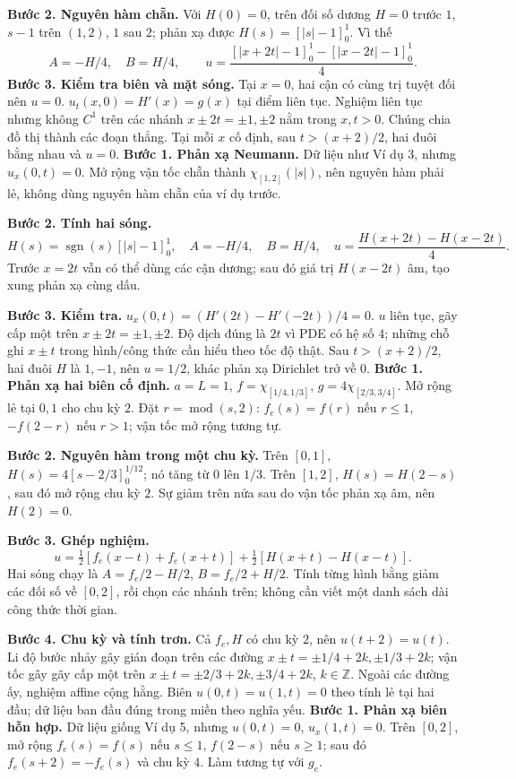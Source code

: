 \textbf{Bước 2. Nguyên hàm chẵn.} Với $H(0)=0$, trên đối số dương $H=0$ trước $1$, $s-1$ trên $(1,2)$, $1$ sau $2$; phản xạ được $H(s)=[|s|-1]_0^1$. Vì thế
\[A=-H/4,\quad B=H/4,\qquad u=\frac{[|x+2t|-1]_0^1-[|x-2t|-1]_0^1}{4}.\]
\textbf{Bước 3. Kiểm tra biên và mặt sóng.} Tại $x=0$, hai cận có cùng trị tuyệt đối nên $u=0$. $u_t(x,0)=H'(x)=g(x)$ tại điểm liên tục. Nghiệm liên tục nhưng không $C^1$ trên các nhánh $x\pm2t=\pm1,\pm2$ nằm trong $x,t>0$. Chúng chia đồ thị thành các đoạn thẳng. Tại mỗi $x$ cố định, sau $t>(x+2)/2$, hai đuôi bằng nhau và $u=0$.
\textbf{Bước 1. Phản xạ Neumann.} Dữ liệu như Ví dụ 3, nhưng $u_x(0,t)=0$. Mở rộng vận tốc chẵn thành $\chi_{[1,2]}(|s|)$, nên nguyên hàm phải lẻ, không dùng nguyên hàm chẵn của ví dụ trước.

\textbf{Bước 2. Tính hai sóng.}
\[H(s)=\operatorname{sgn}(s)[|s|-1]_0^1,\quad A=-H/4,\quad B=H/4,\quad u=\frac{H(x+2t)-H(x-2t)}4.\]
Trước $x=2t$ vẫn có thể dùng các cận dương; sau đó giá trị $H(x-2t)$ âm, tạo xung phản xạ cùng dấu.

\textbf{Bước 3. Kiểm tra.} $u_x(0,t)=(H'(2t)-H'(-2t))/4=0$. $u$ liên tục, gãy cấp một trên $x\pm2t=\pm1,\pm2$. Độ dịch đúng là $2t$ vì PDE có hệ số $4$; những chỗ ghi $x\pm t$ trong hình/công thức cần hiểu theo tốc độ thật. Sau $t>(x+2)/2$, hai đuôi $H$ là $1,-1$, nên $u=1/2$, khác phản xạ Dirichlet trở về $0$.
\textbf{Bước 1. Phản xạ hai biên cố định.} $a=L=1$, $f=\chi_{[1/4,1/3]}$, $g=4\chi_{[2/3,3/4]}$. Mở rộng lẻ tại $0,1$ cho chu kỳ $2$. Đặt $r=\operatorname{mod}(s,2)$: $f_e(s)=f(r)$ nếu $r\le1$, $-f(2-r)$ nếu $r>1$; vận tốc mở rộng tương tự.

\textbf{Bước 2. Nguyên hàm trong một chu kỳ.} Trên $[0,1]$, $H(s)=4[s-2/3]_0^{1/12}$; nó tăng từ $0$ lên $1/3$. Trên $[1,2]$, $H(s)=H(2-s)$, sau đó mở rộng chu kỳ $2$. Sự giảm trên nửa sau do vận tốc phản xạ âm, nên $H(2)=0$.

\textbf{Bước 3. Ghép nghiệm.}
\[u=\tfrac12[f_e(x-t)+f_e(x+t)]+\tfrac12[H(x+t)-H(x-t)].\]
Hai sóng chạy là $A=f_e/2-H/2$, $B=f_e/2+H/2$. Tính từng hình bằng giảm các đối số về $[0,2]$, rồi chọn các nhánh trên; không cần viết một danh sách dài công thức thời gian.

\textbf{Bước 4. Chu kỳ và tính trơn.} Cả $f_e,H$ có chu kỳ $2$, nên $u(t+2)=u(t)$. Li độ bước nhảy gây gián đoạn trên các đường $x\pm t=\pm1/4+2k,\pm1/3+2k$; vận tốc gây gãy cấp một trên $x\pm t=\pm2/3+2k,\pm3/4+2k$, $k\in\mathbb Z$. Ngoài các đường ấy, nghiệm affine cộng hằng. Biên $u(0,t)=u(1,t)=0$ theo tính lẻ tại hai đầu; dữ liệu ban đầu đúng trong miền theo nghĩa yếu.
\textbf{Bước 1. Phản xạ biên hỗn hợp.} Dữ liệu giống Ví dụ 5, nhưng $u(0,t)=0$, $u_x(1,t)=0$. Trên $[0,2]$, mở rộng $f_e(s)=f(s)$ nếu $s\le1$, $f(2-s)$ nếu $s\ge1$; sau đó $f_e(s+2)=-f_e(s)$ và chu kỳ $4$. Làm tương tự với $g_e$.

